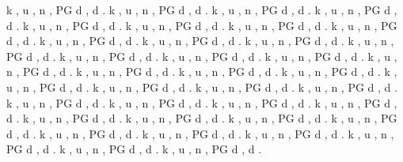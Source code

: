 \documentclass{article}%
\begin{document}
k , u , n , PG d , d .\newline%
k , u , n , PG d , d .\newline%
k , u , n , PG d , d .\newline%
k , u , n , PG d , d .\newline%
k , u , n , PG d , d .\newline%
k , u , n , PG d , d .\newline%
k , u , n , PG d , d .\newline%
k , u , n , PG d , d .\newline%
k , u , n , PG d , d .\newline%
k , u , n , PG d , d .\newline%
k , u , n , PG d , d .\newline%
k , u , n , PG d , d .\newline%
k , u , n , PG d , d .\newline%
k , u , n , PG d , d .\newline%
k , u , n , PG d , d .\newline%
k , u , n , PG d , d .\newline%
k , u , n , PG d , d .\newline%
k , u , n , PG d , d .\newline%
k , u , n , PG d , d .\newline%
k , u , n , PG d , d .\newline%
k , u , n , PG d , d .\newline%
k , u , n , PG d , d .\newline%
k , u , n , PG d , d .\newline%
k , u , n , PG d , d .\newline%
k , u , n , PG d , d .\newline%
k , u , n , PG d , d .\newline%
k , u , n , PG d , d .\newline%
k , u , n , PG d , d .\newline%
k , u , n , PG d , d .\newline%
k , u , n , PG d , d .\newline%
k , u , n , PG d , d .\newline%
k , u , n , PG d , d .\newline%
k , u , n , PG d , d .\newline%
k , u , n , PG d , d .\newline%
k , u , n , PG d , d .\newline%
k , u , n , PG d , d .\newline%
k , u , n , PG d , d .\newline%
\end{document}
